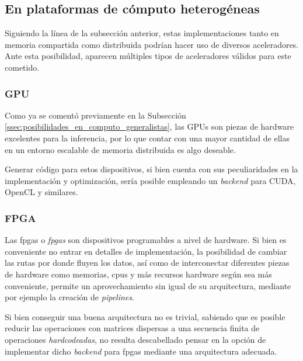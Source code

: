 \subsection{En plataformas de cómputo heterogéneas}
\label{ssec:posibilidades_en_computo_heterogeneas}
Siguiendo la línea de la subsección anterior, estas implementaciones tanto en memoria compartida como distribuida podrían hacer uso de diversos aceleradores. Ante esta posibilidad, aparecen múltiples tipos de aceleradores válidos para este cometido.

\subsubsection{GPU}
\label{sssec:heterogeneas_gpu}
Como ya se comentó previamente en la Subsección \ref{ssec:posibilidades_en_computo_generalistas}, las GPUs son piezas de hardware excelentes para la inferencia, por lo que contar con una mayor cantidad de ellas en un entorno escalable de memoria distribuida es algo deseable.

Generar código para estos dispositivos, si bien cuenta con sus peculiaridades en la implementación y optimización, sería posible empleando un \textit{backend} para CUDA, OpenCL y similares.

\subsubsection{FPGA}
\label{sssec:heterogeneas_fpga}
Las \acrshort{fpga}s o \textit{\acrlong{fpga}s} son dispositivos programables a nivel de hardware. Si bien es conveniente no entrar en detalles de implementación, la posibilidad de cambiar las rutas por donde fluyen los datos, así como de interconectar diferentes piezas de hardware como memorias, \acrshort{cpu}s y más recursos hardware según sea más conveniente, permite un aprovechamiento sin igual de su arquitectura, mediante por ejemplo la creación de \textit{pipelines}.

Si bien conseguir una buena arquitectura no es trivial, sabiendo que es posible reducir las operaciones con matrices dispersas a una secuencia finita de operaciones \textit{hardcodeadas}, no resulta descabellado pensar en la opción de implementar dicho \textit{backend} para \acrshort{fpga}s mediante una arquitectura adecuada.

